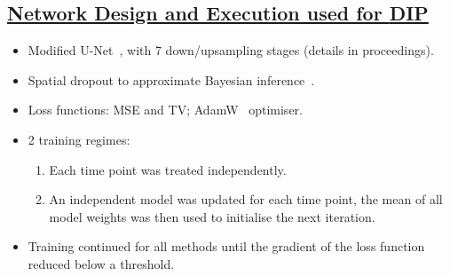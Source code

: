 \documentclass[portrait, color=UCLburgundy, margin=1cm]{uclposter}
\begin{document}
\begin{multicols}{2}
            \subsection*{\underline{\textbf{Network Design and Execution used for \gls{DIP}}}}
                \begin{itemize}
                    \item Modified U-Net~\cite{Weng2015U-Net:Segmentation}, with 7 down/upsampling stages (details in proceedings).
                    \item Spatial dropout to approximate Bayesian inference~\cite{Gal2015DropoutLearning}.
                    \item Loss functions: \acrlong{MSE} and \acrshort{TV};  AdamW~\cite{Loshchilov2017DecoupledRegularization} optimiser.
                    \item 2 training regimes:
                    
                    \begin{enumerate}
                        \item Each time point was treated independently.
                        \item An independent model was updated for each time point, the mean of all model weights was then used to initialise the next iteration.
                    \end{enumerate}
                    
                    \item Training continued for all methods until the gradient of the loss function reduced below a threshold.
                \end{itemize}
            

\end{multicols}
\end{document}
